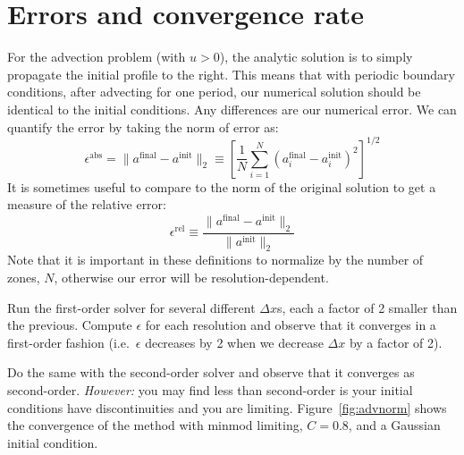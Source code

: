 \section{Errors and convergence rate}

For the advection problem (with $u>0$), the analytic solution is to
simply propagate the initial profile to the right.  This means that
with periodic boundary conditions, after advecting for one period, our
numerical solution should be identical to the initial conditions.  Any
differences are our numerical error.  We can quantify the error by
taking the norm of error as: 
\begin{equation}
\epsilon^\mathrm{abs} = \| a^\mathrm{final} - a^\mathrm{init} \|_2 \equiv
   \left [ \frac{1}{N} \sum_{i=1}^N 
   ( a_i^\mathrm{final} - a_i^\mathrm{init} )^2
  \right ]^{1/2}
\end{equation}
It is sometimes useful to compare to the norm of the original solution
to get a measure of the relative error:
\begin{equation}
\epsilon^\mathrm{rel} \equiv \frac{\| a^\mathrm{final} - a^\mathrm{init} \|_2}
   {\| a^\mathrm{init} \|_2}
\end{equation}
Note that it is important in these definitions to normalize by the number
of zones, $N$, otherwise our error will be resolution-dependent.
%
\begin{exercise}
{ Run the first-order solver for several different $\Delta x$s,
each a factor of 2 smaller than the previous.  Compute $\epsilon$ for
each resolution and observe that it converges in a first-order fashion
(i.e.\ $\epsilon$ decreases by 2 when we decrease $\Delta x$ by a factor of 2).

\noindent Do the same with the second-order solver and observe that it
converges as second-order. {\em However:} you may find less than second-order
is your initial conditions have discontinuities and you are limiting. 
Figure~\ref{fig:advnorm} shows the convergence of the method with minmod
limiting, $C = 0.8$, and a Gaussian initial condition.}
\end{exercise}

